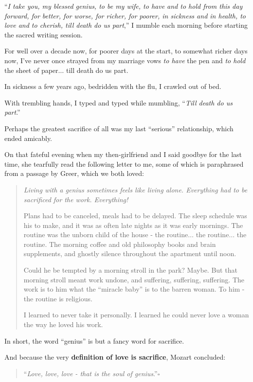 \documentclass{book}
\numberwithin{equation}{section}
\begin{document}
%
``\textit{I take you, my blessed genius, to be my wife, to have and to hold from this day forward, for better, for worse, for richer, for poorer, in sickness and in health, to love and to cherish, till death do us part},'' I mumble each morning before starting the sacred writing session.

%
For well over a decade now, for poorer days at the start, to somewhat richer days now, I've never once strayed from my marriage vows \textit{to have} the pen and \textit{to hold} the sheet of paper$\ldots$ till death do us part.

%
In sickness a few years ago, bedridden with the flu, I crawled out of bed.

With trembling hands, I typed and typed while mumbling, ``\textit{Till death do us part}.''

%
Perhaps the greatest sacrifice of all was my last ``serious'' relationship, which ended amicably.

%
On that fateful evening when my then-girlfriend and I said goodbye for the last time, she tearfully read the following letter to me, some of which is paraphrased from a passage by Greer, which we both loved:

\begin{quotation}
    \it
    Living with a genius sometimes feels like living alone. Everything had to be sacrificed for the work. Everything!
    
    Plans had to be canceled, meals had to be delayed. The sleep schedule was his to make, and it was as often late nights as it was early mornings. The routine was the unborn child of the house - the routine$\ldots$ the routine$\ldots$ the routine. The morning coffee and old philosophy books and brain supplements, and ghostly silence throughout the apartment until noon.
    
    Could he be tempted by a morning stroll in the park? Maybe. But that morning stroll meant work undone, and suffering, suffering, suffering. The work is to him what the ``miracle baby'' is to the barren woman. To him - the routine is religious.
    
    I learned to never take it personally. I learned he could never love a woman the way he loved his work.
\end{quotation}
In short, the word ``genius'' is but a fancy word for sacrifice.

And because the very \textbf{definition of love is sacrifice}, Mozart concluded:

\begin{quotation}
    ``\textit{Love, love, love - that is the soul of genius}.''\hfill$\square$
\end{quotation}
\end{document}
